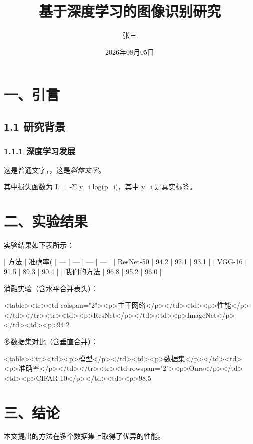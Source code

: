 \documentclass[nomath]{harryopo-paper}
\title{基于深度学习的图像识别研究}
\author{张三}
\date{2026年08月05日}
\begin{document}
\maketitle

\section*{一、引言}

\subsection*{1.1 研究背景}

\subsubsection*{1.1.1 深度学习发展}

这是普通文字，，这是\textit{斜体文字}。

其中损失函数为 L = -Σ y_i log(p_i)，其中 y_i 是真实标签。

\section*{二、实验结果}

实验结果如下表所示：

| 方法 | 准确率(%
| --- | --- | --- | --- |
| ResNet-50 | 94.2 | 92.1 | 93.1 |
| VGG-16 | 91.5 | 89.3 | 90.4 |
| 我们的方法 | 96.8 | 95.2 | 96.0 |

消融实验（含水平合并表头）：

<table><tr><td colspan="2"><p>主干网络</p></td><td><p>性能</p></td></tr><tr><td><p>ResNet</p></td><td><p>ImageNet</p></td><td><p>94.2%

多数据集对比（含垂直合并）：

<table><tr><td><p>模型</p></td><td><p>数据集</p></td><td><p>准确率</p></td></tr><tr><td rowspan="2"><p>Ours</p></td><td><p>CIFAR-10</p></td><td><p>98.5%

\section*{三、结论}

本文提出的方法在多个数据集上取得了优异的性能。
\end{document}
